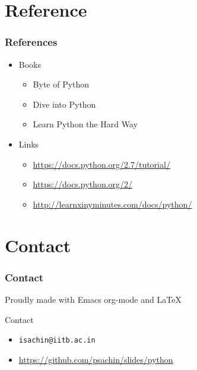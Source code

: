 \documentclass[bigger, presentation]{beamer}
\begin{document}
\section{Reference}
\label{sec-5}
\begin{frame}
\frametitle{References}
\label{sec-5-1}

\begin{itemize}
\item Books
\begin{itemize}
\item Byte of Python
\item Dive into Python
\item Learn Python the Hard Way
\end{itemize}
\item Links
\begin{itemize}
\item \href{https://docs.python.org/2.7/tutorial/}{https://docs.python.org/2.7/tutorial/}
\item \href{https://docs.python.org/2/}{https://docs.python.org/2/}
\item \href{http://learnxinyminutes.com/docs/python/}{http://learnxinyminutes.com/docs/python/}
\end{itemize}
\end{itemize}
\end{frame}
\section{Contact}
\label{sec-6}
\begin{frame}
\frametitle{Contact}
\label{sec-6-1}

   Proudly made with Emacs org-mode and \LaTeX{}
\begin{block}{Contact}
\label{sec-6-1-1}

\begin{itemize}
\item \texttt{isachin@iitb.ac.in}
\item \href{https://github.com/psachin/slides/python}{https://github.com/psachin/slides/python}
\end{itemize}
\end{block}
\end{frame}
\end{document}
